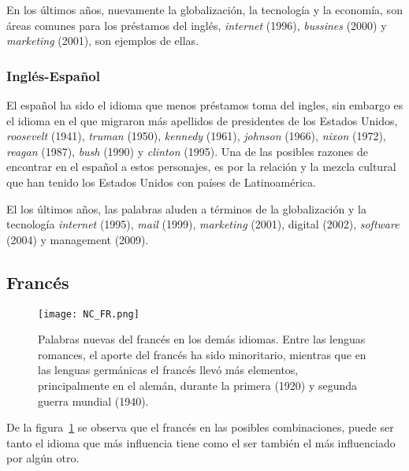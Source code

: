 En los últimos años, nuevamente la globalización, la tecnología y la economía, son áreas comunes para los préstamos del inglés, \textit{internet} (1996), \textit{bussines} (2000) y \textit{marketing} (2001), son ejemplos de ellas. 


\subsubsection*{Inglés-Español} 

El español ha sido el idioma que menos préstamos toma del ingles,  sin  embargo es el idioma en el que migraron más apellidos de presidentes de los Estados Unidos, \textit{roosevelt} (1941), \textit{truman} (1950), \textit{kennedy} (1961), \textit{johnson} (1966),  \textit{nixon} (1972),  \textit{reagan} (1987), \textit{bush} (1990) y \textit{clinton} (1995).  Una de las posibles razones de encontrar en el español a estos personajes,  es por la relación y la mezcla cultural que han tenido los Estados Unidos con países de Latinoamérica.  

El los últimos años, las palabras aluden a términos de la globalización y la tecnología  \textit{internet} (1995), \textit{mail} (1999), \textit{marketing} (2001),  digital (2002), \textit{software} (2004) y management (2009).  


\subsection{Francés} %

\begin{figure}[h!]
	\centering
	\texttt{[image: NC\_FR.png]}
	\caption{Palabras nuevas del francés en los demás idiomas. Entre las lenguas romances, el aporte del francés ha sido minoritario, mientras que en las lenguas germánicas el francés llevó más elementos, principalmente en el alemán, durante la primera (1920) y segunda guerra mundial (1940).}
	\label{fig.NC_FR}
	
	
\end{figure}

De la figura~\ref{fig.NC_FR} se observa que el francés en las posibles combinaciones, puede ser tanto el idioma que más influencia tiene como el ser también el más influenciado por algún otro. 

